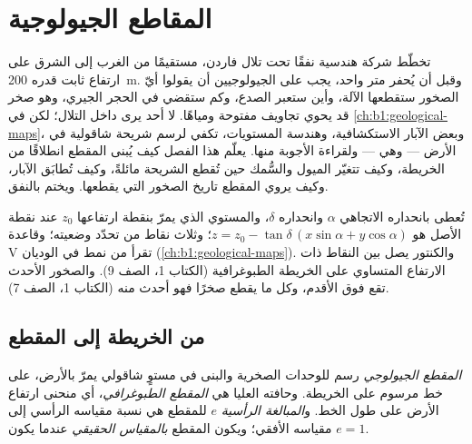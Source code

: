 \chapter{المقاطع الجيولوجية}\label{ch:b1:cross-sections}

تخطّط شركة هندسية نفقًا تحت تلال فاردن، مستقيمًا من الغرب إلى الشرق على ارتفاع ثابت قدره \qty{200}{m}. وقبل أن يُحفر متر واحد، يجب على الجيولوجيين أن يقولوا أيّ الصخور ستقطعها الآلة، وأين ستعبر الصدع، وكم ستقضي في الحجر الجيري، وهو صخر قد يحوي تجاويف مفتوحة ومياهًا. لا أحد يرى داخل التلال؛ لكن  في \cref{ch:b1:geological-maps}، وبعض الآبار الاستكشافية، وهندسة المستويات، تكفي لرسم شريحة شاقولية في الأرض ---
وهي  --- ولقراءة الأجوبة منها. يعلّم هذا الفصل كيف يُبنى المقطع انطلاقًا من الخريطة، وكيف تتغيّر الميول والسُّمك حين تُقطع الشريحة مائلةً، وكيف تُطابَق الآبار، وكيف يروي المقطع تاريخ الصخور التي يقطعها. ويختم بالنفق.

\begin{recall}
تُعطى  بانحداره الاتجاهي $\alpha$ وانحداره $\delta$، والمستوي الذي يمرّ بنقطة ارتفاعها $z_0$ عند نقطة الأصل هو
$z = z_0 - \tan\delta\,(x\sin\alpha + y\cos\alpha)$؛ وثلاث نقاط من  تحدّد وضعيته؛ وقاعدة V تقرأ  من نمط  في الوديان (\cref{ch:b1:geological-maps}). والكنتور يصل بين النقاط ذات الارتفاع المتساوي على الخريطة الطبوغرافية (الكتاب 1، الصف 9). والصخور الأحدث تقع فوق الأقدم، وكل ما يقطع صخرًا فهو أحدث منه (الكتاب 1، الصف 7).
\end{recall}

\section{من الخريطة إلى المقطع}

\begin{definition}\label{def:b1:cross-sections:section}
\emph{المقطع الجيولوجي} رسم للوحدات الصخرية والبنى في مستوٍ شاقولي يمرّ بالأرض، على خط مرسوم على الخريطة. وحافته العليا هي \emph{المقطع الطبوغرافي}، أي منحنى ارتفاع الأرض على طول الخط. و\emph{المبالغة الرأسية} $e$ للمقطع هي نسبة مقياسه الرأسي إلى مقياسه الأفقي؛ ويكون المقطع \emph{بالمقياس الحقيقي} عندما يكون $e = 1$.
\end{definition}

